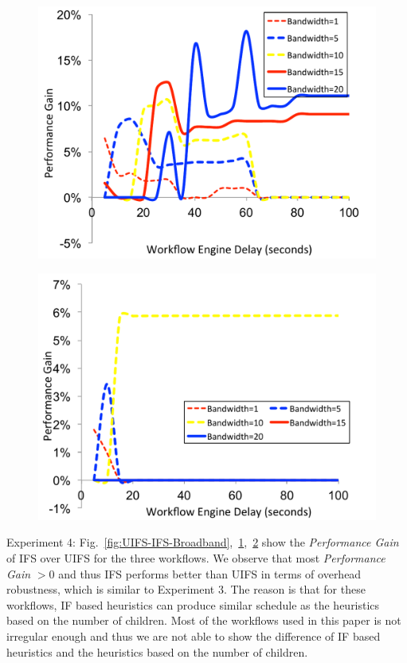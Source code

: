\documentclass[final]{IEEEtran}
\begin{document}
\begin{figure}[!htb]
\centering
 \includegraphics[width=0.9\linewidth]{figure/UIFS-IFS-CyberShake.pdf}
  \label{fig:UIFS-IFS-CyberShake}
  \vspace{-10pt}
\end{figure}

\begin{figure}[!htb]
\centering
 \includegraphics[width=0.9\linewidth]{figure/UIFS-IFS-Montage.pdf}
  \label{fig:UIFS-IFS-Montage}
  \vspace{-10pt}
\end{figure}
Experiment 4: Fig.~\ref{fig:UIFS-IFS-Broadband},~\ref{fig:UIFS-IFS-CyberShake},~\ref{fig:UIFS-IFS-Montage} show the \emph{Performance Gain} of IFS over UIFS for the three workflows. We observe that most  \emph{Performance Gain} $>0$ and thus IFS performs better than UIFS in terms of overhead robustness, which is similar to Experiment 3. The reason is that for these workflows, IF based heuristics can produce similar schedule as the heuristics based on the number of children. Most of the workflows used in this paper is not irregular enough and thus we are not able to show the difference of IF based heuristics and the heuristics based on the number of children. 
\end{document}

